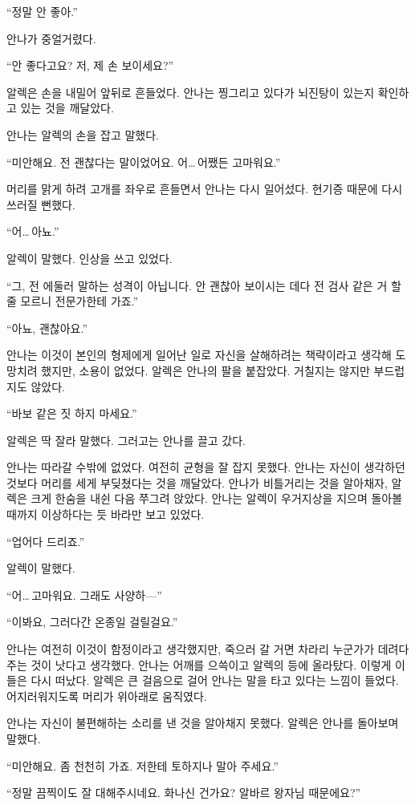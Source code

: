 ``정말 안 좋아.''

안나가 중얼거렸다.

``안 좋다고요? 저, 제 손 보이세요?''

알렉은 손을 내밀어 앞뒤로 흔들었다. 안나는 찡그리고 있다가 뇌진탕이 있는지 확인하고 있는 것을 깨달았다.

안나는 알렉의 손을 잡고 말했다.

``미안해요. 전 괜찮다는 말이었어요. 어\ldots\,어쨌든 고마워요.''

머리를 맑게 하려 고개를 좌우로 흔들면서 안나는 다시 일어섰다. 현기증 때문에 다시 쓰러질 뻔했다.

``어\ldots\,아뇨.''

알렉이 말했다. 인상을 쓰고 있었다.

``그, 전 에둘러 말하는 성격이 아닙니다. 안 괜찮아 보이시는 데다 전 검사 같은 거 할 줄 모르니 전문가한테 가죠.''

``아뇨, 괜찮아요.''

안나는 이것이 본인의 형제에게 일어난 일로 자신을 살해하려는 책략이라고 생각해 도망치려 했지만, 소용이 없었다. 알렉은 안나의 팔을 붙잡았다. 거칠지는 않지만 부드럽지도 않았다.

``바보 같은 짓 하지 마세요.''

알렉은 딱 잘라 말했다. 그러고는 안나를 끌고 갔다.

안나는 따라갈 수밖에 없었다. 여전히 균형을 잘 잡지 못했다. 안나는 자신이 생각하던 것보다 머리를 세게 부딪쳤다는 것을 깨달았다. 안나가 비틀거리는 것을 알아채자, 알렉은 크게 한숨을 내쉰 다음 쭈그려 앉았다. 안나는 알렉이 우거지상을 지으며 돌아볼 때까지 이상하다는 듯 바라만 보고 있었다.

``업어다 드리죠.''

알렉이 말했다.

``어\ldots\,고마워요. 그래도 사양하—''

``이봐요, 그러다간 온종일 걸릴걸요.''

안나는 여전히 이것이 함정이라고 생각했지만, 죽으러 갈 거면 차라리 누군가가 데려다 주는 것이 낫다고 생각했다. 안나는 어깨를 으쓱이고 알렉의 등에 올라탔다. 이렇게 이들은 다시 떠났다. 알렉은 큰 걸음으로 걸어 안나는 말을 타고 있다는 느낌이 들었다. 어지러워지도록 머리가 위아래로 움직였다.

안나는 자신이 불편해하는 소리를 낸 것을 알아채지 못했다. 알렉은 안나를 돌아보며 말했다.

``미안해요. 좀 천천히 가죠. 저한테 토하지나 말아 주세요.''

``정말 끔찍이도 잘 대해주시네요. 화나신 건가요? 알바르 왕자님 때문에요?''

